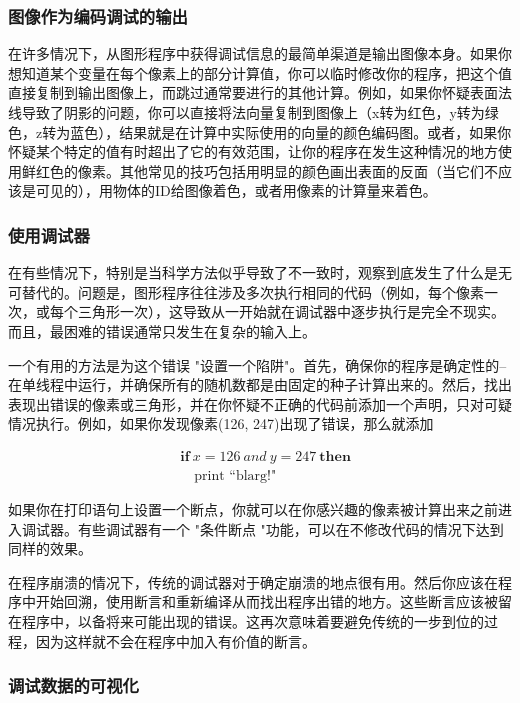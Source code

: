\documentclass[lang=cn,12pt]{elegantbook}
\begin{document}
\subsubsection{图像作为编码调试的输出}

在许多情况下，从图形程序中获得调试信息的最简单渠道是输出图像本身。如果你想知道某个变量在每个像素上的部分计算值，你可以临时修改你的程序，把这个值直接复制到输出图像上，而跳过通常要进行的其他计算。例如，如果你怀疑表面法线导致了阴影的问题，你可以直接将法向量复制到图像上（x转为红色，y转为绿色，z转为蓝色），结果就是在计算中实际使用的向量的颜色编码图。或者，如果你怀疑某个特定的值有时超出了它的有效范围，让你的程序在发生这种情况的地方使用鲜红色的像素。其他常见的技巧包括用明显的颜色画出表面的反面（当它们不应该是可见的），用物体的ID给图像着色，或者用像素的计算量来着色。

\subsubsection{使用调试器}

在有些情况下，特别是当科学方法似乎导致了不一致时，观察到底发生了什么是无可替代的。问题是，图形程序往往涉及多次执行相同的代码（例如，每个像素一次，或每个三角形一次），这导致从一开始就在调试器中逐步执行是完全不现实。而且，最困难的错误通常只发生在复杂的输入上。

一个有用的方法是为这个错误 "设置一个陷阱"。首先，确保你的程序是确定性的--在单线程中运行，并确保所有的随机数都是由固定的种子计算出来的。然后，找出表现出错误的像素或三角形，并在你怀疑不正确的代码前添加一个声明，只对可疑情况执行。例如，如果你发现像素(126, 247)出现了错误，那么就添加


\[
  \begin{aligned}
  &\textbf{if}\ x=126 \ and\ y=247 \ \textbf{then} \\ 
  &\quad \text{print\ ``blarg!"}
  \end{aligned}
\]

如果你在打印语句上设置一个断点，你就可以在你感兴趣的像素被计算出来之前进入调试器。有些调试器有一个 "条件断点 "功能，可以在不修改代码的情况下达到同样的效果。

在程序崩溃的情况下，传统的调试器对于确定崩溃的地点很有用。然后你应该在程序中开始回溯，使用断言和重新编译从而找出程序出错的地方。这些断言应该被留在程序中，以备将来可能出现的错误。这再次意味着要避免传统的一步到位的过程，因为这样就不会在程序中加入有价值的断言。

\subsubsection{调试数据的可视化}
\end{document}
